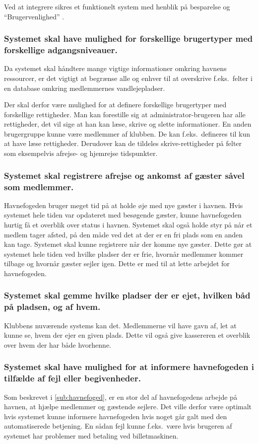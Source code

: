   Ved at integrere sikres et funktionelt system med henblik på besparelse og “Brugervenlighed” .

  \subsubsection{Systemet skal have mulighed for forskellige brugertyper med forskellige adgangsniveauer.}
  Da systemet skal håndtere mange vigtige informationer omkring havnens ressourcer, er det vigtigt at begrænse alle og enhver til at overskrive f.eks.\ felter i en database omkring medlemmernes vandlejepladser.

  Der skal derfor være mulighed for at definere forskellige brugertyper med forskellige rettigheder. Man kan forestille sig at administrator-brugeren har alle rettigheder, det vil sige at han kan læse, skrive og slette informationer. En anden brugergruppe kunne være medlemmer af klubben. De kan f.eks.\ defineres til kun at have læse rettigheder. Derudover kan de tildeles skrive-rettigheder på felter som eksempelvis afrejse- og hjemrejse tidspunkter.

  \subsubsection{Systemet skal registrere afrejse og ankomst af gæster såvel som medlemmer.}
  Havnefogeden bruger meget tid på at holde øje med nye gæster i havnen. Hvis systemet hele tiden var opdateret med besøgende gæster, kunne havnefogeden hurtig få et overblik over status i havnen. Systemet skal også holde styr på når et medlem tager afsted, på den måde ved det at der er en fri plads som en anden kan tage. Systemet skal kunne registrere når der komme nye gæster. Dette gør at systemet hele tiden ved hvilke pladser der er frie, hvornår medlemmer kommer tilbage og hvornår gæster sejler igen. Dette er med til at lette arbejdet for havnefogeden.

  \subsubsection{Systemet skal gemme hvilke pladser der er ejet, hvilken båd på pladsen, og af hvem.}
  Klubbens nuværende systems kan det. Medlemmerne vil have gavn af, let at kunne se, hvem der ejer en given plads. Dette vil også give kassereren et overblik over hvem der har både hvorhenne.

  \subsubsection{Systemet skal have mulighed for at informere havnefogeden i tilfælde af fejl eller begivenheder.}
  Som beskrevet i \cref{sub:havnefoged}, er en stor del af havnefogedens arbejde på havnen, at hjælpe medlemmer og gæstende sejlere. Det ville derfor være optimalt hvis systemet kunne informere havnefogeden hvis noget går galt med den automatiserede betjening. En sådan fejl kunne f.eks.\ være hvis brugeren af systemet har problemer med betaling ved billetmaskinen.

